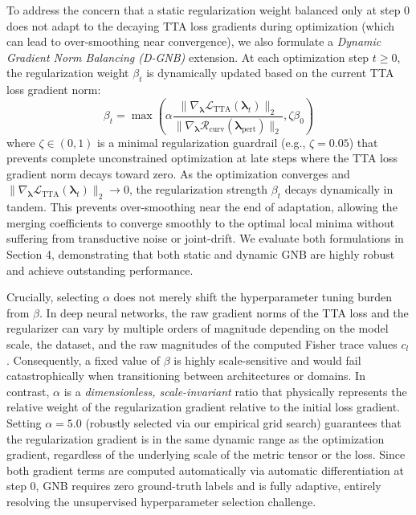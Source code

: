 To address the concern that a static regularization weight balanced only at step 0 does not adapt to the decaying TTA loss gradients during optimization (which can lead to over-smoothing near convergence), we also formulate a \emph{Dynamic Gradient Norm Balancing (D-GNB)} extension. At each optimization step $t \ge 0$, the regularization weight $\beta_t$ is dynamically updated based on the current TTA loss gradient norm:
\begin{equation}
\label{eq:dynamic_gnb}
\beta_t = \max\left( \alpha \frac{\|\nabla_{\boldsymbol{\lambda}} \mathcal{L}_{\text{TTA}}(\boldsymbol{\lambda}_t)\|_2}{\|\nabla_{\boldsymbol{\lambda}} \mathcal{R}_{\text{curv}}(\boldsymbol{\lambda}_{\text{pert}})\|_2}, \zeta \beta_0 \right)
\end{equation}
where $\zeta \in (0, 1)$ is a minimal regularization guardrail (e.g., $\zeta = 0.05$) that prevents complete unconstrained optimization at late steps where the TTA loss gradient norm decays toward zero. As the optimization converges and $\|\nabla_{\boldsymbol{\lambda}} \mathcal{L}_{\text{TTA}}(\boldsymbol{\lambda}_t)\|_2 \to 0$, the regularization strength $\beta_t$ decays dynamically in tandem. This prevents over-smoothing near the end of adaptation, allowing the merging coefficients to converge smoothly to the optimal local minima without suffering from transductive noise or joint-drift. We evaluate both formulations in Section 4, demonstrating that both static and dynamic GNB are highly robust and achieve outstanding performance.

Crucially, selecting $\alpha$ does not merely shift the hyperparameter tuning burden from $\beta$. In deep neural networks, the raw gradient norms of the TTA loss and the regularizer can vary by multiple orders of magnitude depending on the model scale, the dataset, and the raw magnitudes of the computed Fisher trace values $c_l$. Consequently, a fixed value of $\beta$ is highly scale-sensitive and would fail catastrophically when transitioning between architectures or domains. In contrast, $\alpha$ is a \emph{dimensionless, scale-invariant} ratio that physically represents the relative weight of the regularization gradient relative to the initial loss gradient. Setting $\alpha = 5.0$ (robustly selected via our empirical grid search) guarantees that the regularization gradient is in the same dynamic range as the optimization gradient, regardless of the underlying scale of the metric tensor or the loss. Since both gradient terms are computed automatically via automatic differentiation at step 0, GNB requires zero ground-truth labels and is fully adaptive, entirely resolving the unsupervised hyperparameter selection challenge.

